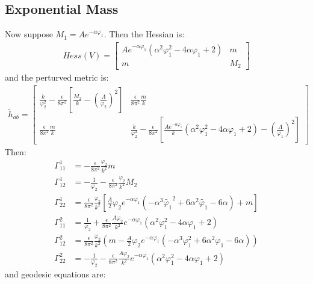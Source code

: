 \subsection{Exponential Mass}
Now suppose $M_{1} = A e^{-\alpha \varphi_{1}}$. Then the Hessian is:
\begin{align}
    Hess(V) = 
    \begin{bmatrix}
        Ae^{-\alpha \varphi_{1}}(\alpha^{2}\varphi_{1}^{2} - 4\alpha\varphi_{1} + 2) & m \\
        m & M_2
    \end{bmatrix}
\end{align}
and the perturved metric is:
\begin{align}
    \tilde h_{ab} = 
    \begin{bmatrix}
        \frac{k}{\varphi_{2}^{2}} -\frac{\epsilon}{8\pi^{2}}[\frac{M_{2}}{k} - (\frac{\Lambda}{\varphi_{2}})^{2}] & \frac{\epsilon}{8\pi^{2}}\frac{m}{k} \\
        \frac{\epsilon}{8\pi^{2}}\frac{m}{k} & \frac{k}{\varphi_{2}^{2}} -\frac{\epsilon}{8\pi^{2}} [\frac{Ae^{-\alpha\varphi_{1}}}{k}(\alpha^{2} \varphi_{1}^{2} - 4\alpha\varphi_{1} + 2) - (\frac{\Lambda}{\varphi_{1}})^{2}]
    \end{bmatrix}
\end{align}
Then:
\begin{align}
    \Gamma_{11}^{1} &= -\frac{\epsilon}{8\pi^{2}}\frac{\varphi_{2}}{k^{2}}m \\
    \Gamma_{12}^{1} &= -\frac{1}{\varphi_{2}} - \frac{\epsilon}{8\pi^{2}}\frac{\varphi_{2}}{k^{2}}M_{2} \\
    \Gamma_{22}^{1} &= \frac{\epsilon}{8\pi^{2}} \frac{\varphi_{2}}{k^{2}}[\frac{A}{2}\varphi_{2} e^{-\alpha\varphi_{1}} (-\alpha^{3}\tilde{\varphi_{1}}^{2} + 6\alpha^{2} \tilde{\varphi_{1}} - 6\alpha)+m]\\
    \Gamma_{11}^{2} &= \frac{1}{\varphi_{2}} + \frac{\epsilon}{8\pi^{2}}\frac{A\varphi_{2}}{k^{2}}e^{-\alpha\varphi_{1}}(\alpha^{2}\varphi_{1}^{2} - 4\alpha\varphi_{1} +2) \\
    \Gamma_{12}^{2} &= \frac{\epsilon}{8\pi^{2}} \frac{\varphi_{2}}{k^{2}}(m - \frac{A}{2} \varphi_{2} e^{-\alpha \varphi_{1}} (-\alpha^{3} \varphi_{1}^{2} + 6\alpha^{2} \varphi_{1} -6\alpha)) \\
    \Gamma_{22}^{2} &= -\frac{1}{\varphi_{2}} - \frac{\epsilon}{8\pi^{2}}\frac{A\varphi_{2}}{k^{2}}e^{-\alpha\varphi_{1}} (\alpha^{2} \varphi_{1}^{2} -4\alpha \varphi_{1} +2)
\end{align}
and geodesic equations are:
